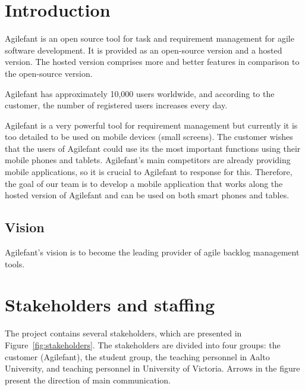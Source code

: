 \section{Introduction}
Agilefant is an open source tool for task and requirement management for agile 
software development. It is provided as an open-source version and a hosted 
version. The hosted version comprises more and better features in comparison to 
the open-source version.

Agilefant has approximately 10,000 users worldwide, and according to the 
customer, the number of registered users increases every day. 
 
Agilefant is a very powerful tool for requirement management but currently it 
is too detailed to be used on mobile devices (small screens). The customer 
wishes that the users of Agilefant could use its the most important functions 
using their mobile phones and tablets. Agilefant's main competitors are already 
providing mobile applications, so it is crucial to Agilefant to response for 
this. Therefore, the goal of our team is to develop a mobile application that 
works along the hosted version of Agilefant and can be used on both smart 
phones and tables.

\subsection{Vision}

Agilefant's vision is to become the leading provider of agile backlog management tools.

\section{Stakeholders and staffing}

The project contains several stakeholders, which are presented in 
Figure~\ref{fig:stakeholders}. The stakeholders are divided into four groups: the customer 
(Agilefant), the student group, the teaching personnel in Aalto University, and teaching 
personnel in University of Victoria. Arrows in the figure present the direction of main 
communication.

